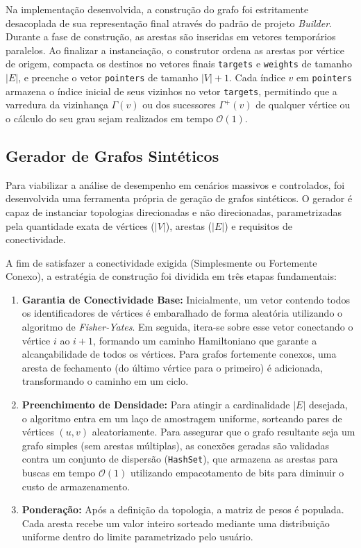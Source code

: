 \documentclass[12pt]{article}
\begin{document}
Na implementação desenvolvida, a construção do grafo foi estritamente desacoplada de sua representação final através do padrão de projeto \textit{Builder}. Durante a fase de construção, as arestas são inseridas em vetores temporários paralelos. Ao finalizar a instanciação, o construtor ordena as arestas por vértice de origem, compacta os destinos no vetores finais \texttt{targets} e \texttt{weights} de tamanho $|E|$, e preenche o vetor \texttt{pointers} de tamanho $|V| + 1$. Cada índice $v$ em \texttt{pointers} armazena o índice inicial de seus vizinhos no vetor \texttt{targets}, permitindo que a varredura da vizinhança $\Gamma(v)$ ou dos sucessores $\Gamma^+(v)$ de qualquer vértice ou o cálculo do seu grau sejam realizados em tempo $\mathcal{O}(1)$.

\subsection{Gerador de Grafos Sintéticos} \label{gerador}

Para viabilizar a análise de desempenho em cenários massivos e controlados, foi desenvolvida uma ferramenta própria de geração de grafos sintéticos. O gerador é capaz de instanciar topologias direcionadas e não direcionadas, parametrizadas pela quantidade exata de vértices ($|V|$), arestas ($|E|$) e requisitos de conectividade.

A fim de satisfazer a conectividade exigida (Simplesmente ou Fortemente Conexo), a estratégia de construção foi dividida em três etapas fundamentais:

\begin{enumerate}
    \item \textbf{Garantia de Conectividade Base:} Inicialmente, um vetor contendo todos os identificadores de vértices é embaralhado de forma aleatória utilizando o algoritmo de \textit{Fisher-Yates}. Em seguida, itera-se sobre esse vetor conectando o vértice $i$ ao $i+1$, formando um caminho Hamiltoniano que garante a alcançabilidade de todos os vértices. Para grafos fortemente conexos, uma aresta de fechamento (do último vértice para o primeiro) é adicionada, transformando o caminho em um ciclo.
    
    \item \textbf{Preenchimento de Densidade:} Para atingir a cardinalidade $|E|$ desejada, o algoritmo entra em um laço de amostragem uniforme, sorteando pares de vértices $(u, v)$ aleatoriamente. Para assegurar que o grafo resultante seja um grafo simples (sem arestas múltiplas), as conexões geradas são validadas contra um conjunto de dispersão (\texttt{HashSet}), que armazena as arestas para buscas em tempo $\mathcal{O}(1)$ utilizando empacotamento de bits para diminuir o custo de armazenamento.
    
    \item \textbf{Ponderação:} Após a definição da topologia, a matriz de pesos é populada. Cada aresta recebe um valor inteiro sorteado mediante uma distribuição uniforme dentro do limite parametrizado pelo usuário.
\end{enumerate}
\end{document}
